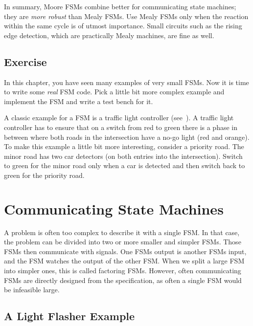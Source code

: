 \documentclass[%
    10pt,
    headinclude, footexclude,
    openright, %
    notitlepage,
    cleardoubleempty,
    headsepline,
    pointlessnumbers,
    bibtotoc, idxtotoc,
    ]{scrbook}
\newcommand{\todo}[1]{{\emph{TODO: #1}}}
\renewcommand{\todo}[1]{}
\begin{document}
In summary, Moore FSMs combine better for communicating state machines; they
are \emph{more robust} than Mealy FSMs. Use Mealy FSMs only when the reaction within the same
cycle is of utmost importance. Small circuits such as the rising edge detection,
which are practically Mealy machines, are fine as well.

\section{Exercise}

In this chapter, you have seen many examples of very small FSMs.
Now it is time to write some \emph{real} FSM code.
Pick a little bit more complex example and implement the FSM and
write a test bench for it.

A classic example for a FSM is a traffic light controller (see~\cite[Section~14.3]{dally:vhdl:2016}).
A traffic light controller has to ensure that on a switch from red to green
there is a phase in between where both roads in the intersection
have a no-go light (red and orange).
To make this example a little bit more interesting, consider a priority road.
The minor road has two car detectors (on both entries into the intersection).
Switch to green for the minor road only when a car is detected and then switch
back to green for the priority road.

\todo{Luca: Greatest common divisor with Euclide algorithm can be also a nice exercise.
Martin: but this is shown at the Chisel homepage without an FSM.}

\chapter{Communicating State Machines}

A problem is often too complex to describe it with a single FSM.
In that case, the problem can be divided into two or more smaller and simpler FSMs.
Those FSMs then communicate with signals. One FSMs output is
another FSMs input, and the FSM watches the output of the other FSM.
When we split a large FSM into simpler ones, this is called factoring FSMs.
However, often communicating FSMs are directly designed from the specification,
as often a single FSM would be infeasible large.

\section{A Light Flasher Example}
\end{document}
